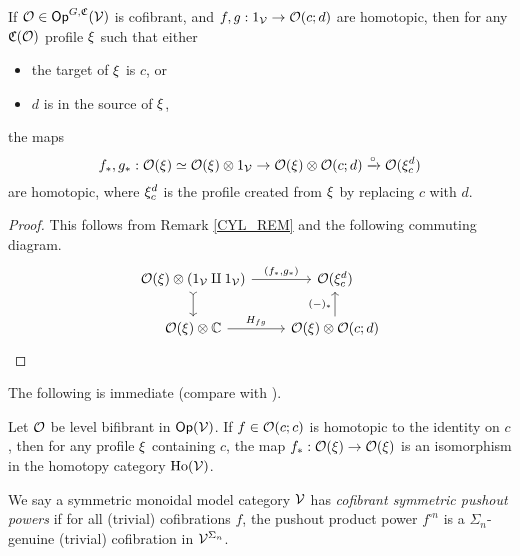 \documentclass[a4paper,10pt
,draft
]{article}%
\renewcommand{\1}{\eta}%
\begin{document}
\begin{lemma}
      If $\mathcal{O} \in \mathsf{Op}^{G, \mathfrak C}(\mathcal V)$ is cofibrant,
      and $f,g: 1_{\mathcal V} \to \mathcal{O}(c;d)$ are homotopic, then for any $\mathfrak C(\mathcal{O})$ profile $\xi$ such that either
      \begin{itemize} %
      \item the target of $\xi$ is $c$, or
      \item $d$ is in the source of $\xi$,
      \end{itemize}
      the maps
      \begin{equation}
            f_{\**}, g_{\**}: \O(\ksi) \simeq \O(\ksi) \otimes 1_\V \to \O(\ksi) \otimes \O(c;d) \xrightarrow{\circ} \O(\ksi_c^d)
      \end{equation}
      are homotopic,
      where $\xi_c^d$ is the profile created from $\xi$ by replacing $c$ with $d$.
\end{lemma}
\begin{proof}
      This follows from Remark \ref{CYL_REM} and the following commuting diagram.
      \begin{equation}
            \begin{tikzcd}
                  \O(\ksi) \otimes (1_\V \amalg 1_\V) \arrow[r, "{(f_{\**}, g_{\**})}"] \arrow[d, tail]
                  &
                  \O(\ksi_c^d)
                  \\
                  \O(\ksi) \otimes \mathbb C \arrow[r, "H_{fg}"]
                  &
                  \O(\ksi) \otimes \O(c;d) \arrow[u, "{(-)_{\**}}"]
            \end{tikzcd}
      \end{equation}
\end{proof}

The following is immediate (compare with \cite[Lemma 1.23]{GM17}).
\begin{corollary}
      \label{HTPIC_ISO_COR}
      Let $\mathcal{O}$ be level bifibrant in $\mathsf{Op}(\mathcal V)$. 
      If $f \in \mathcal{O}(c;c)$ is homotopic to the identity on $c$, then for any profile $\xi$ containing $c$, the map
      $f_{\**}: \O(\ksi) \to \O(\ksi)$
     is an isomorphism in the homotopy category $\operatorname{Ho}(\mathcal V)$.
\end{corollary}




\begin{definition}
        We say a symmetric monoidal model category $\mathcal V$ has \textit{cofibrant symmetric pushout powers} if
        for all (trivial) cofibrations $f$, the pushout product power $f^{\square n}$
        is a $\Sigma_n$-genuine (trivial) cofibration in $\mathcal V^{\Sigma_n}$. 
\end{definition}
\end{document}
